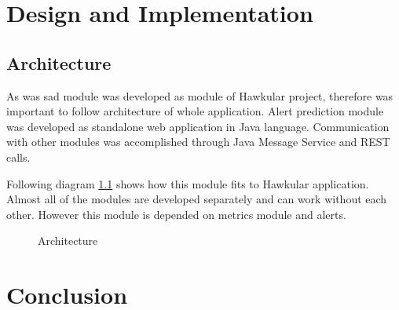 \chapter{Design and Implementation}
\section{Architecture}
As was sad module was developed as module of Hawkular project, therefore was
important to follow architecture of whole application. Alert prediction module
was developed as standalone web application in Java language. Communication with
other modules was accomplished through Java Message Service and REST calls. 

Following diagram \ref{img_arch} shows how this module fits to Hawkular application.
Almost all of the modules are developed separately and can work without each
other. However this module is depended on metrics module and alerts. 
\begin{figure}[H]
    \begin{center}
        \caption{Architecture}
        \label{img_arch}
    \end{center}
\end{figure}

\chapter{Conclusion}
\cite{rfc_owamp} %

